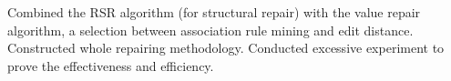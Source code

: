 \begin{cventries}
{\begin{cvitems}
        \item{Combined the RSR algorithm (for structural repair) with the value repair algorithm, a selection between association rule mining and edit distance. Constructed whole repairing methodology. Conducted excessive experiment to prove the effectiveness and efficiency.}
      \end{cvitems}
    }

\end{cventries}
